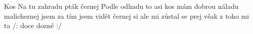 \begin{TEXT}{Kos}
\SLOKA Na tu  zahradu \NL
{} pták černej \NL
Podle  odhadu \NL
{} to asi kos 
\SLOKA {} mám dobrou náladu \NL
{} malichernej \NL
{} jsem za tím  \NL
{}     \NL
{} jsem vidět  \NL
{} černej  \NL
{} si ale  \NL
{}  
\SLOKA {} mi    zůstal  \NL
{} se prej   však z toho  \NL
{} mi ta             \NL
/:  doce   dozně :/
\end{TEXT}
